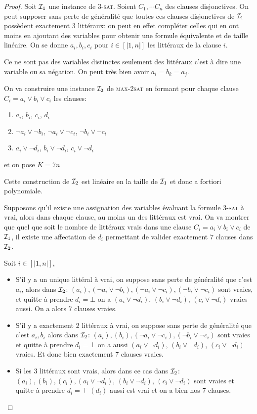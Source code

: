 \documentclass{standalone}
\begin{document}
\begin{proof}
	Soit $\mathcal I_1$ une instance de \textsc{3-sat}. Soient $C_1, \cdots C_n$ des clauses disjonctives. On peut supposer sans perte de généralité que toutes ces clauses disjonctives de $\mathcal I_1$ possèdent exactement 3 littéraux: on peut en effet compléter celles qui en ont moins en ajoutant des variables pour obtenir une formule équivalente et de taille linéaire. On se donne $a_i, b_i, c_i$ pour $i \in [|1, n|]$ les littéraux de la clause $i$. 
	
	\begin{rem}
		Ce ne sont pas des variables distinctes seulement des littéraux c'est à dire une variable ou sa négation. On peut très bien avoir $a_i = b_k = a_j$.
	\end{rem}
	On va construire une instance $\mathcal I_2$ de \textsc{max-2sat} en formant pour chaque clause $C_i = a_i \lor b_i \lor c_i$ les clauses:
	\begin{enumerate}
		\item $a_i$, $b_i$, $c_i$, $d_i$
		\item $\neg a_i \lor \neg b_i$, $\neg a_i \lor \neg c_i$, $\neg b_i \lor \neg c_i$
		\item $a_i \lor \neg d_i$, $b_i \lor \neg d_i$, $c_i \lor \neg d_i$
	\end{enumerate}

	et on pose $K = 7n$
	
	Cette construction de $\mathcal I_2$ est linéaire en la taille de $\mathcal I_1$ et donc a fortiori polynomiale.
	
	Supposons qu'il existe une assignation des variables évaluant la formule \textsc{3-sat} à vrai, alors dans chaque clause, au moins un des littéraux est vrai. On va montrer que quel que soit le nombre de littéraux vrais dans une clause $C_i = a_i \lor b_i \lor c_i$ de $\mathcal I_1$, il existe une affectation de $d_i$ permettant de valider exactement $7$ clauses dans $\mathcal I_2$.
	
	Soit $i \in [|1, n|]$, 
		\begin{itemize}
			\item S'il y a un unique littéral à vrai, on suppose sans perte de généralité que c'est $a_i$, alors dans $\mathcal I_2$: $(a_i), (\neg a_i \lor \neg b_i), (\neg a_i \lor \neg c_i), (\neg b_i \lor \neg c_i)$ sont vraies, et quitte à prendre $d_i=\bot$ on a  $(a_i \lor \neg d_i)$, $(b_i \lor \neg d_i)$, $(c_i \lor \neg d_i)$ vraies aussi. On a alors $7$ clauses vraies.
			\item S'il y a exactement 2 littéraux à vrai, on suppose sans perte de généralité que c'est $a_i, b_i$ alors dans $\mathcal I_2$: $(a_i), (b_i), (\neg a_i \lor \neg c_i), (\neg b_i \lor \neg c_i)$ sont vraies et quitte à prendre $d_i=\bot$ on a aussi $(a_i \lor \neg d_i)$, $(b_i \lor \neg d_i)$, $(c_i \lor \neg d_i)$ vraies. Et donc bien exactement 7 clauses vraies.
			\item Si les 3 littéraux sont vrais, alors dans ce cas dans $\mathcal I_2$: $(a_i), (b_i), (c_i), (a_i \lor \neg d_i)$, $(b_i \lor \neg d_i)$, $(c_i \lor \neg d_i)$ sont vraies et quitte à prendre $d_i=\top$ $(d_i)$ aussi est vrai et on a bien nos $7$ clauses.
		\end{itemize}
	

\end{proof}
\end{document}
